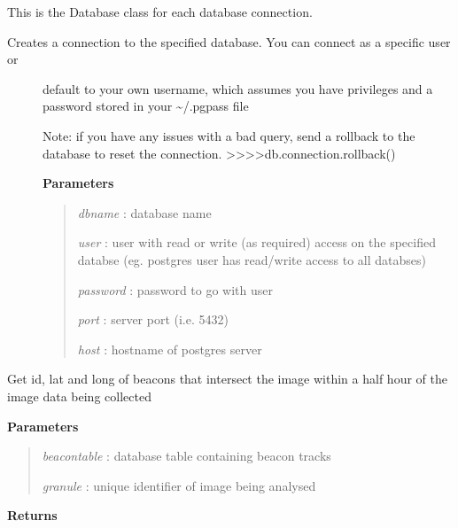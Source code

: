 \documentclass[letterpaper,10pt,openany,oneside]{sphinxmanual}
\begin{document}
\begin{fulllineitems}
\label{code:Database.Database}
This is the Database class for each database connection.
\begin{description}
\item[{Creates a connection to the specified database.  You can connect as a specific user or }] \leavevmode
default to your own username, which assumes you have privileges and a password stored in your  \textasciitilde{}/.pgpass file

Note: if you have any issues with a bad query, send a rollback to the database to reset the connection.
\textgreater{}\textgreater{}\textgreater{}\textgreater{}db.connection.rollback()

\textbf{Parameters}
\begin{quote}

\emph{dbname}   : database name

\emph{user}     : user with read or write (as required) access on the specified databse (eg. postgres user has read/write access to all databses)

\emph{password} : password to go with user

\emph{port}     : server port (i.e. 5432)

\emph{host}     : hostname of postgres server
\end{quote}

\end{description}

\begin{fulllineitems}
\label{code:Database.Database.beaconIntersections}
Get id, lat and long of beacons that intersect the image within a half hour of the image data being collected

\textbf{Parameters}
\begin{quote}

\emph{beacontable} : database table containing beacon tracks

\emph{granule} : unique identifier of image being analysed
\end{quote}

\textbf{Returns}
\begin{quote}


\end{quote}
\end{fulllineitems}
\end{fulllineitems}
\end{document}
